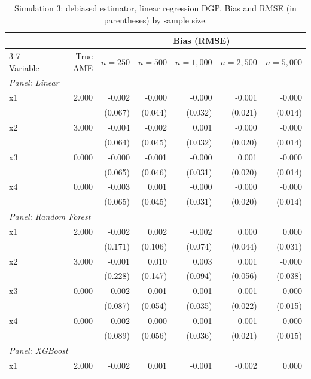 \documentclass[12pt,a4paper]{article}
\numberwithin{equation}{section}
\theoremstyle{plain}
\theoremstyle{definition}
\begin{document}
	\begin{table}[htbp]
		\centering
		\small
		\begin{threeparttable}
			\caption{Simulation 3: debiased estimator, linear regression DGP. Bias and RMSE (in parentheses) by sample size.}
			\label{tab:sim3_bias_regression_linear}
			\begin{tabular}{lrrrrrr}
				\toprule
				& & \multicolumn{5}{c}{Bias (RMSE)} \\
				\cmidrule(lr){3-7}
				Variable & True AME & $n=250$ & $n=500$ & $n=1,000$ & $n=2,500$ & $n=5,000$ \\
				\midrule
				\multicolumn{7}{l}{\textit{Panel: Linear}} \\
				\quad x1 & 2.000 & -0.002 & -0.000 & -0.000 & -0.001 & -0.000 \\
				&  & (0.067) & (0.044) & (0.032) & (0.021) & (0.014) \\
				\quad x2 & 3.000 & -0.004 & -0.002 & 0.001 & -0.000 & -0.000 \\
				&  & (0.064) & (0.045) & (0.032) & (0.020) & (0.014) \\
				\quad x3 & 0.000 & -0.000 & -0.001 & -0.000 & 0.001 & -0.000 \\
				&  & (0.065) & (0.046) & (0.031) & (0.020) & (0.014) \\
				\quad x4 & 0.000 & -0.003 & 0.001 & -0.000 & -0.000 & -0.000 \\
				&  & (0.065) & (0.045) & (0.031) & (0.020) & (0.014) \\
				\midrule
				\multicolumn{7}{l}{\textit{Panel: Random Forest}} \\
				\quad x1 & 2.000 & -0.002 & 0.002 & -0.002 & 0.000 & 0.000 \\
				&  & (0.171) & (0.106) & (0.074) & (0.044) & (0.031) \\
				\quad x2 & 3.000 & -0.001 & 0.010 & 0.003 & 0.001 & -0.000 \\
				&  & (0.228) & (0.147) & (0.094) & (0.056) & (0.038) \\
				\quad x3 & 0.000 & 0.002 & 0.001 & -0.001 & 0.001 & -0.000 \\
				&  & (0.087) & (0.054) & (0.035) & (0.022) & (0.015) \\
				\quad x4 & 0.000 & -0.002 & 0.000 & -0.001 & -0.001 & -0.000 \\
				&  & (0.089) & (0.056) & (0.036) & (0.021) & (0.015) \\
				\midrule
				\multicolumn{7}{l}{\textit{Panel: XGBoost}} \\
				\quad x1 & 2.000 & -0.002 & 0.001 & -0.001 & -0.002 & 0.000 \\

\end{tabular}
\end{threeparttable}
\end{table}
\end{document}
